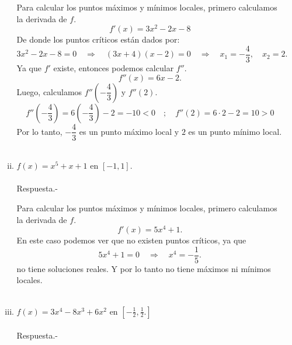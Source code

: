 \begin{enumerate}[\bfseries 1.]
\begin{enumerate}[(i)]
		Para calcular los puntos máximos y mínimos locales, primero calculamos la derivada de $f$.
		$$f'(x)=3x^2-2x-8$$
		De donde los puntos críticos están dados por:
		$$3x^2-2x-8=0 \quad \Rightarrow \quad (3x+4)(x-2)=0 \quad \Rightarrow \quad x_1=-\dfrac{4}{3},\quad x_2=2.$$
		Ya que $f'$ existe, entonces podemos calcular $f''$.
		$$f''(x)=6x-2.$$
		Luego, calculamos $f''\left(-\dfrac{4}{3}\right)$ y $f''(2)$.
		$$f''\left(-\dfrac{4}{3}\right)=6\left(-\dfrac{4}{3}\right)-2=-10<0\quad ;\quad  f''(2)=6\cdot 2 - 2=10>0$$
		Por lo tanto, $-\dfrac{4}{3}$ es un punto máximo local y $2$ es un punto mínimo local.\\\\

	    \item $f(x)=x^5+x+1$ en $[-1,1]$.\\\\
		Respuesta.-\; 
		\begin{center}
		\end{center}

		Para calcular los puntos máximos y mínimos locales, primero calculamos la derivada de $f$.
		$$f'(x)=5x^4+1.$$
		En este caso podemos ver que no existen puntos críticos, ya que
		$$5x^4+1=0 \quad \Rightarrow \quad x^4=-\dfrac{1}{5}.$$
		no tiene soluciones reales. Y por lo tanto no tiene máximos ni mínimos locales.\\\\

	    \item $f(x)=3x^4-8x^3+6x^2$ en $\left[-\frac{1}{2},\frac{1}{2}.\right]$\\\\
		Respuesta.-\; 
		\begin{center}
		\end{center}


\end{enumerate}
\end{enumerate}
